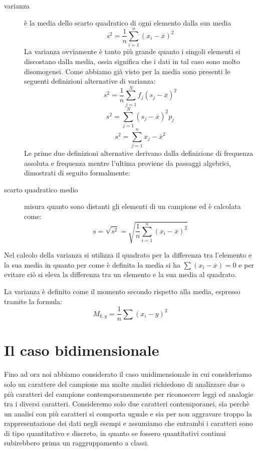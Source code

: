 \documentclass[a4paper,12pt, oneside]{book}
\begin{document}
\begin{description}
        \item [varianza] è la media dello scarto quadratico di ogni elemento dalla sua media 
                \[ s^2 = \frac{1}{n} \sum _{i = 1} ^ n (x_i - \overline{x})^2 \]
                La varianza ovviamente è tanto più grande quanto i singoli elementi si discostano dalla media, 
                ossia significa che i dati in tal caso sono molto disomogenei.
                Come abbiamo già visto per la media sono presenti le seguenti definizioni alternative di varianza:
                \[ s^2 = \frac{1}{n} \sum _{j = 1} ^ N f_j (s_j - \overline{x}) ^ 2 \]
                \[ s^2 = \sum _{j = 1} ^ N (s_j - \overline{x}) ^ 2 p_j \]
                \[ s^2 = \sum _{j = 1} ^ n x_j - \overline{x} ^ 2 \]
                Le prime due definizioni alternative derivano dalla definizione di frequenza assoluta e frequenza 
                mentre l'ultima proviene da passaggi algebrici, dimostrati di seguito formalmente:

    \item [scarto quadratico medio] misura quanto sono distanti gli elementi di un campione ed è calcolata come:
            \[ s = \sqrt{s^2} = \sqrt{\frac{1}{n} \sum _{i = 1} ^ n (x_i - \overline{x}) ^ 2} \]
\end{description}
Nel calcolo della varianza si utilizza il quadrato per la differenza tra l'elemento e la sua media in quanto 
per come è definita la media si ha $\sum (x_i - \overline{x}) = 0$ e per evitare ciò si eleva la differenza 
tra un elemento e la sua media al quadrato.

La varianza è definito come il momento secondo rispetto alla media, espresso tramite la formula:
\[ M_{k,y}=\frac{1}{n}\sum (x_i-y)^2 \]

\section{Il caso bidimensionale}
Fino ad ora noi abbiamo considerato il caso unidimensionale in cui consideriamo solo un carattere del campione ma 
molte analisi richiedono di analizzare due o più caratteri del campione contemporaneamente per riconoscere 
leggi ed analogie tra i diversi caratteri.\newline
Consideremo solo due caratteri contemporanei, sia perchè un analisi con più caratteri si comporta uguale e sia 
per non aggravare troppo la rappresentazione dei dati negli esempi e assumiamo che entrambi i caratteri sono di
tipo quantitativo e discreto, in quanto se fossero quantitativi continui subirebbero prima un raggruppamento a classi.
\end{document}
